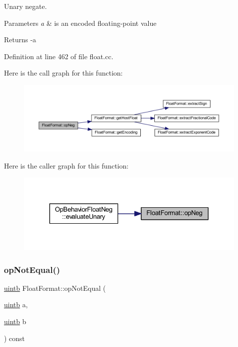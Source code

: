 Unary negate. 


\begin{DoxyParams}{Parameters}
{\em a} & is an encoded floating-\/point value \\
\hline
\end{DoxyParams}
\begin{DoxyReturn}{Returns}
-\/a 
\end{DoxyReturn}


Definition at line 462 of file float.\+cc.

Here is the call graph for this function\+:
\nopagebreak
\begin{figure}[H]
\begin{center}
\leavevmode
\includegraphics[width=350pt]{class_float_format_af639368d2760482533e8ebf5ee18995b_cgraph}
\end{center}
\end{figure}
Here is the caller graph for this function\+:
\nopagebreak
\begin{figure}[H]
\begin{center}
\leavevmode
\includegraphics[width=324pt]{class_float_format_af639368d2760482533e8ebf5ee18995b_icgraph}
\end{center}
\end{figure}
\mbox{\label{class_float_format_a1f28cec1861ddf0f416033f971a43b16}} 
\subsubsection{\texorpdfstring{opNotEqual()}{opNotEqual()}}
{\footnotesize\ttfamily \mbox{\hyperlink{types_8h_a2db313c5d32a12b01d26ac9b3bca178f}{uintb}} Float\+Format\+::op\+Not\+Equal (\begin{DoxyParamCaption}\item[{\mbox{\hyperlink{types_8h_a2db313c5d32a12b01d26ac9b3bca178f}{uintb}}}]{a,  }\item[{\mbox{\hyperlink{types_8h_a2db313c5d32a12b01d26ac9b3bca178f}{uintb}}}]{b }\end{DoxyParamCaption}) const}



